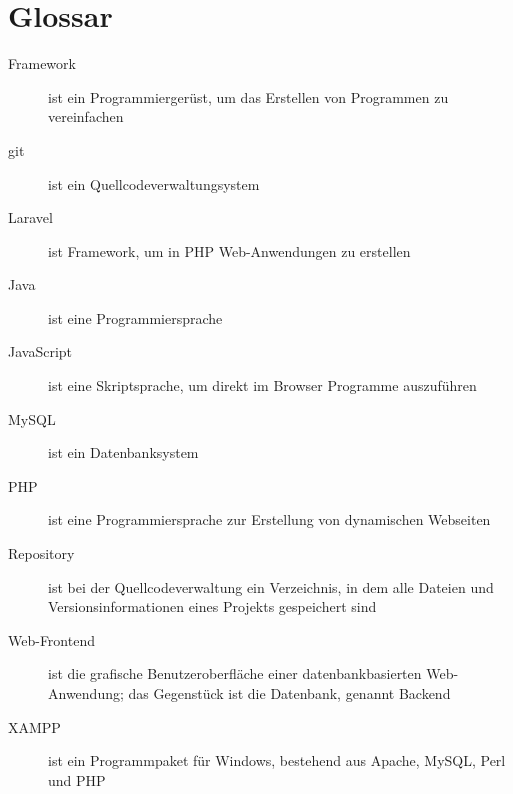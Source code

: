 

\chapter*{Glossar}

\begin{description}
\item [Framework] ist ein Programmiergerüst, um das Erstellen von Programmen zu vereinfachen

\item [git] ist ein Quellcodeverwaltungsystem

\item [Laravel] ist Framework, um in PHP Web-Anwendungen zu erstellen

\item [Java] ist eine Programmiersprache

\item [JavaScript] ist eine Skriptsprache, um direkt im Browser Programme auszuführen
	
\item [MySQL] ist ein Datenbanksystem

\item [PHP] ist eine Programmiersprache zur Erstellung von dynamischen Webseiten 

\item [Repository] ist bei der Quellcodeverwaltung ein Verzeichnis, in dem alle Dateien und Versionsinformationen eines Projekts gespeichert sind

\item [Web-Frontend] ist die grafische Benutzeroberfläche einer datenbankbasierten Web-Anwendung; das Gegenstück ist die Datenbank, genannt Backend

\item [XAMPP] ist ein Programmpaket für Windows, bestehend aus Apache, MySQL, Perl und PHP 

\end{description}
